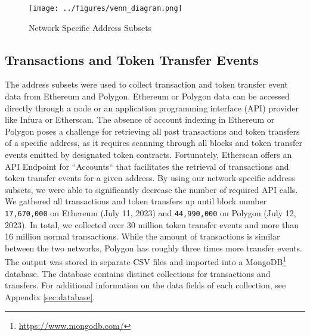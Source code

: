 \documentclass[12pt,a4paper,titlepage,oneside,english]{article}
\begin{document}
\begin{figure}[h!]
	\centering
	\texttt{[image: ../figures/venn\_diagram.png]}
	\caption{Network Specific Address Subsets}
	\label{fig:Venn}
\end{figure} 

\subsection{Transactions and Token Transfer Events}
The address subsets were used to collect transaction and token transfer event data from Ethereum and Polygon. Ethereum or Polygon data can be accessed directly through a node or an application programming interface (API) provider like Infura or Etherscan. The absence of account indexing in Ethereum or Polygon poses a challenge for retrieving all past transactions and token transfers of a specific address, as it requires scanning through all blocks and token transfer events emitted by designated token contracts. Fortunately, Etherscan offers an API Endpoint for ``Accounts`` that facilitates the retrieval of transactions and token transfer events for a given address. By using our network-specific address subsets, we were able to significantly decrease the number of required API calls. 
We gathered all transactions and token transfers up until block number \texttt{17,670,000} on Ethereum (July 11, 2023) and \texttt{44,990,000} on Polygon (July 12, 2023). In total, we collected over 30 million %
token transfer events and more than 16 million %
 normal transactions. While the amount of transactions is similar between the two networks, Polygon has roughly three times more transfer events. \newline The output was stored in separate CSV files and imported into a MongoDB\footnote{\url{https://www.mongodb.com/}} database. The database contains distinct collections for transactions and transfers. For additional information on the data fields of each collection, see Appendix \ref{sec:database}. 
\end{document}
